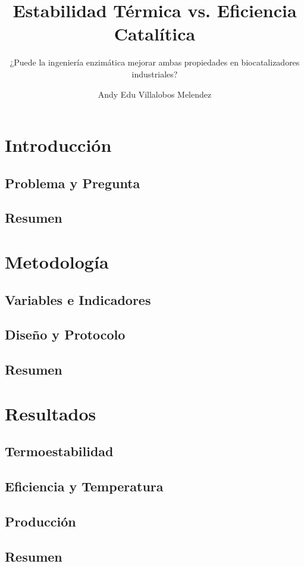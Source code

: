 \documentclass[aspectratio=169,9pt]{beamer}
\title{Estabilidad Térmica vs. Eficiencia Catalítica}
\subtitle{¿Puede la ingeniería enzimática mejorar ambas propiedades en biocatalizadores industriales?}
\author{Andy Edu Villalobos Melendez}
\institute{Pontificia Universidad Católica del Perú}
\date{}
\begin{document}
\section{Introducción}
\subsection{Problema y Pregunta}

\subsection{Resumen}


\section{Metodología}
\subsection{Variables e Indicadores}

\subsection{Diseño y Protocolo}

\subsection{Resumen}


\section{Resultados}
\subsection{Termoestabilidad}

\subsection{Eficiencia y Temperatura}

\subsection{Producción}

\subsection{Resumen}

\end{document}

